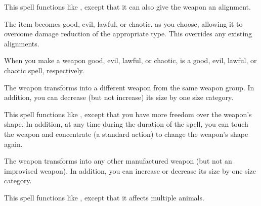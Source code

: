 \begin{spelleffect}
    This spell functions like , except that it can also give the weapon an alignment.
\end{spelleffect}
\begin{spellsuccess}
    The item becomes good, evil, lawful, or chaotic, as you choose, allowing it to overcome damage reduction of the appropriate type. This overrides any existing alignments.
\end{spellsuccess}
\begin{spellnotes}
    When you make a weapon good, evil, lawful, or chaotic,  is a good, evil, lawful, or chaotic spell, respectively.
\end{spellnotes}

\spelldur{\durmed}
\begin{spellsuccess}
    The weapon transforms into a different weapon from the same weapon group. In addition, you can decrease (but not increase) its size by one size category.
\end{spellsuccess}

\begin{spelleffect}
    This spell functions like , except that you have more freedom over the weapon's shape. In addition, at any time during the duration of the spell, you can touch the weapon and concentrate (a standard action) to change the weapon's shape again.
\end{spelleffect}
\begin{spellsuccess}
    The weapon transforms into any other manufactured weapon (but not an improvised weapon). In addition, you can increase or decrease its size by one size category.
\end{spellsuccess}

\begin{spelleffect}
    This spell functions like , except that it affects multiple animals.
\end{spelleffect}

